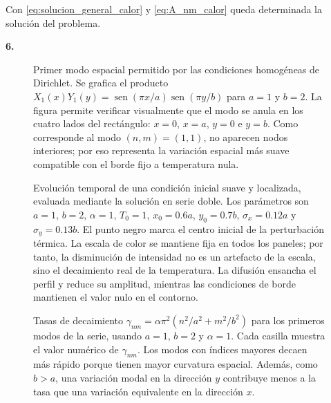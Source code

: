 \documentclass[11pt]{article}
\newcommand{\problema}[2]{%
\vspace{0.55em}
\noindent\textbf{#1.}\enspace{\small #2}\par
\vspace{0.3em}}
\newcommand{\sen}{\operatorname{sen}}
\begin{document}
Con \eqref{eq:solucion_general_calor} y \eqref{eq:A_nm_calor} queda determinada la solución del problema.


\problema{6}{Gráficos}

\begin{figure}[H]
    \centering
    
    \caption{Primer modo espacial permitido por las condiciones homogéneas de Dirichlet. Se grafica el producto $X_1(x)Y_1(y)=\sen(\pi x/a)\sen(\pi y/b)$ para $a=1$ y $b=2$. La figura permite verificar visualmente que el modo se anula en los cuatro lados del rectángulo: $x=0$, $x=a$, $y=0$ e $y=b$. Como corresponde al modo $(n,m)=(1,1)$, no aparecen nodos interiores; por eso representa la variación espacial más suave compatible con el borde fijo a temperatura nula.}
    \label{fig:calor-modo-11}
\end{figure}

\begin{figure}[H]
    \centering
    
    \caption{Evolución temporal de una condición inicial suave y localizada, evaluada mediante la solución en serie doble. Los parámetros son $a=1$, $b=2$, $\alpha=1$, $T_0=1$, $x_0=0.6a$, $y_0=0.7b$, $\sigma_x=0.12a$ y $\sigma_y=0.13b$. El punto negro marca el centro inicial de la perturbación térmica. La escala de color se mantiene fija en todos los paneles; por tanto, la disminución de intensidad no es un artefacto de la escala, sino el decaimiento real de la temperatura. La difusión ensancha el perfil y reduce su amplitud, mientras las condiciones de borde mantienen el valor nulo en el contorno.}
    \label{fig:calor-evolucion}
\end{figure}

\begin{figure}[H]
    \centering
    
    \caption{Tasas de decaimiento $\gamma_{nm}=\alpha\pi^2(n^2/a^2+m^2/b^2)$ para los primeros modos de la serie, usando $a=1$, $b=2$ y $\alpha=1$. Cada casilla muestra el valor numérico de $\gamma_{nm}$. Los modos con índices mayores decaen más rápido porque tienen mayor curvatura espacial. Además, como $b>a$, una variación modal en la dirección $y$ contribuye menos a la tasa que una variación equivalente en la dirección $x$.}
    \label{fig:calor-tasas}
\end{figure}
\end{document}
